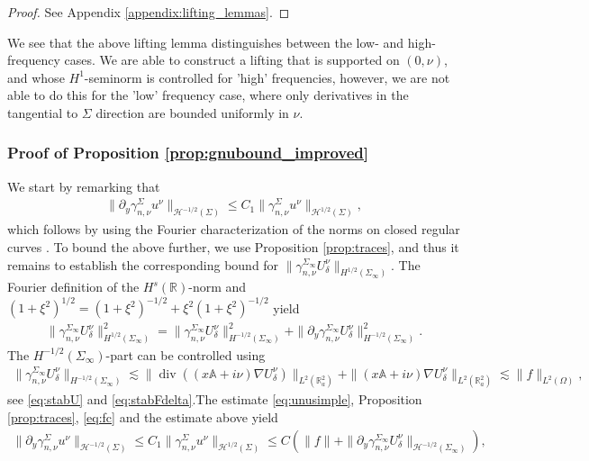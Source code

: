 \documentclass[report]{elsarticle}
\numberwithin{theorem}{section}
\begin{document}
\begin{proof}
	See Appendix \ref{appendix:lifting_lemmas}.
\end{proof}
We see that the above lifting lemma distinguishes between the low- and high-frequency cases. We are able to construct a lifting that is supported on $(0,\nu)$, and whose $H^1$-seminorm is controlled for 'high' frequencies, however, we are not able to do this for the 
'low' frequency case, where only derivatives in the tangential to $\Sigma$ direction are bounded uniformly in $\nu$. 
\subsubsection{{Proof of Proposition \ref{prop:gnubound_improved}}}
We start by remarking that
\begin{align}
	\label{eq:unusimple}
	\|\partial_y\gamma_{n, \nu}^{\Sigma}u^{\nu}\|_{\mathcal{H}^{-1/2}(\Sigma)}\leq C_1\|\gamma_{n, \nu}^{\Sigma}u^{\nu}\|_{\mathcal{H}^{1/2}(\Sigma)},
\end{align}
which follows by using the Fourier characterization of the norms on closed regular curves \cite[Section 4.2.1]{wendland_hsiao}. To bound the above further, we use Proposition \ref{prop:traces}, and thus it remains to establish the corresponding bound for  $\|\gamma_{n,\nu}^{\Sigma_{\infty}}U^{\nu}_{\delta}\|_{{H}^{1/2}(\Sigma_{\infty})}$. The Fourier definition of the $H^{s}(\mathbb{R})$-norm and $(1+\xi^2)^{1/2}= (1+\xi^2)^{-1/2}+\xi^2(1+\xi^2)^{-1/2}$ yield
\begin{align}
	\label{eq:fc}
	\|\gamma_{n,\nu}^{\Sigma_{\infty}}U^{\nu}_{\delta}\|_{H^{1/2}(\Sigma_{\infty})}^2= \|\gamma_{n,\nu}^{\Sigma_{\infty}}U^{\nu}_{\delta}\|_{H^{-1/2}(\Sigma_{\infty})}^2+\|\partial_y \gamma_{n,\nu}^{\Sigma_{\infty}}U^{\nu}_{\delta}\|_{H^{-1/2}(\Sigma_{\infty})}^2.
\end{align}
The $H^{-1/2}(\Sigma_{\infty})$-part can be controlled using 
\begin{align*}
	\|\gamma_{n,\nu}^{\Sigma_{\infty}}U^{\nu}_{\delta}\|_{H^{-1/2}(\Sigma_{\infty})}\lesssim \|\operatorname{div}((x\mathbb{A}+i\nu)\nabla U^{\nu}_{\delta})\|_{L^2(\mathbb{R}^2_a)}+\|(x\mathbb{A}+i\nu)\nabla U^{\nu}_{\delta}\|_{L^2(\mathbb{R}^2_a)}\lesssim \|f\|_{L^2(\Omega)},
\end{align*} 
see \eqref{eq:stabU} and \eqref{eq:stabFdelta}.The estimate \eqref{eq:unusimple}, Proposition \ref{prop:traces}, \eqref{eq:fc} and the estimate above yield
\begin{align}
	\label{eq:unu_vs_Unu}
	\|\partial_y\gamma_{n, \nu}^{\Sigma}u^{\nu}\|_{\mathcal{H}^{-1/2}(\Sigma)}\leq C_1 \|\gamma_{n,\nu}^{\Sigma}u^{\nu}\|_{\mathcal{H}^{1/2}(\Sigma)}\leq C(\|f\|+	\|\partial_y\gamma_{n, \nu}^{\Sigma_{\infty}}U^{\nu}_{\delta}\|_{\mathcal{H}^{-1/2}(\Sigma_{\infty})}),
\end{align}
\end{document}
